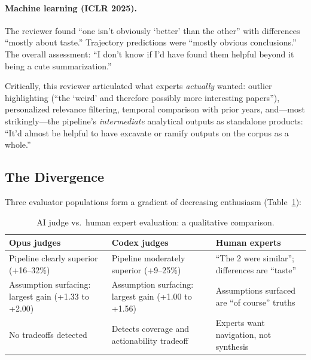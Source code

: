 \documentclass{article}
\begin{document}
\paragraph{Machine learning (ICLR 2025).} The reviewer found ``one isn't obviously `better' than the other'' with differences ``mostly about taste.'' Trajectory predictions were ``mostly obvious conclusions.'' The overall assessment: ``I don't know if I'd have found them helpful beyond it being a cute summarization.''

Critically, this reviewer articulated what experts \textit{actually} wanted: outlier highlighting (``the `weird' and therefore possibly more interesting papers''), personalized relevance filtering, temporal comparison with prior years, and---most strikingly---the pipeline's \textit{intermediate} analytical outputs as standalone products: ``It'd almost be helpful to have excavate or ramify outputs on the corpus as a whole.''

\subsection{The Divergence}

Three evaluator populations form a gradient of decreasing enthusiasm (Table~\ref{tab:divergence}):

\begin{table}[t]
\caption{AI judge vs.\ human expert evaluation: a qualitative comparison.}
\label{tab:divergence}
\begin{center}
\small
\begin{tabular}{p{2.1cm}p{2.3cm}p{3.8cm}}
\toprule
\textbf{Opus judges} & \textbf{Codex judges} & \textbf{Human experts} \\
\midrule
Pipeline clearly superior (+16--32\%) & Pipeline moderately superior (+9--25\%) & ``The 2 were similar''; differences are ``taste'' \\
\addlinespace
Assumption surfacing: largest gain (+1.33 to +2.00) & Assumption surfacing: largest gain (+1.00 to +1.56) & Assumptions surfaced are ``of course'' truths \\
\addlinespace
No tradeoffs detected & Detects coverage and actionability tradeoff & Experts want navigation, not synthesis \\
\bottomrule
\end{tabular}
\end{center}
\end{table}
\end{document}
